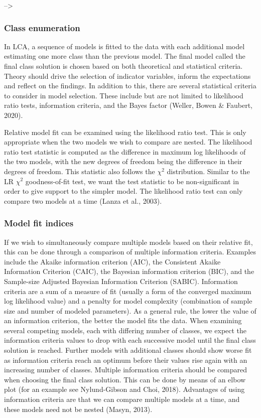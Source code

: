 \documentclass[
  ,man]{apa6}
\begin{document}
--\textgreater{}

\hypertarget{class-enumeration}{%
\subsubsection{Class enumeration}\label{class-enumeration}}

In LCA, a sequence of models is fitted to the data
with each additional model estimating one more class than the previous model.
The final model called the final class solution is chosen based on both theoretical and statistical criteria.
Theory should drive the selection of indicator variables, inform the expectations and reflect on the findings.
In addition to this, there are several statistical criteria to consider in model selection.
These include but are not limited to likelihood ratio tests, information criteria,
and the Bayes factor (Weller, Bowen \& Faubert, 2020).

Relative model fit can be examined using the likelihood ratio test.
This is only appropriate when the two models we wish to compare are nested.
The likelihood ratio test statistic is computed as the difference in maximum log likelihoods of the two models,
with the new degrees of freedom being the difference in their degrees of freedom.
This statistic also follows the \(\chi^2\) distribution.
Similar to the LR \(\chi^2\) goodness-of-fit test, we want the test statistic to be non-significant
in order to give support to the simpler model.
The likelihood ratio test can only compare two models at a time (Lanza et al., 2003).

\hypertarget{model-fit-indices}{%
\subsubsection{Model fit indices}\label{model-fit-indices}}

If we wish to simultaneously compare multiple models based on their relative fit,
this can be done through a comparison of multiple information criteria.
Examples include the Akaike information criterion (AIC), the Consistent Akaike Information Criterion (CAIC),
the Bayesian information criterion (BIC), and the Sample-size Adjusted Bayesian Information Criterion (SABIC).
Information criteria are a sum of a measure of fit (usually a form of the converged maximum log likelihood value)
and a penalty for model complexity (combination of sample size and number of modeled parameters).
As a general rule, the lower the value of an information criterion, the better the model fits the data.
When examining several competing models, each with differing number of classes,
we expect the information criteria values to drop with each successive model until the final class solution is reached.
Further models with additional classes should show worse fit as information criteria reach an optimum
before their values rise again with an increasing number of classes.
Multiple information criteria should be compared when choosing the final class solution.
This can be done by means of an elbow plot (for an example see Nylund-Gibson and Choi, 2018).
Advantages of using information criteria are that we can compare multiple models at a time,
and these models need not be nested (Masyn, 2013).
\end{document}
